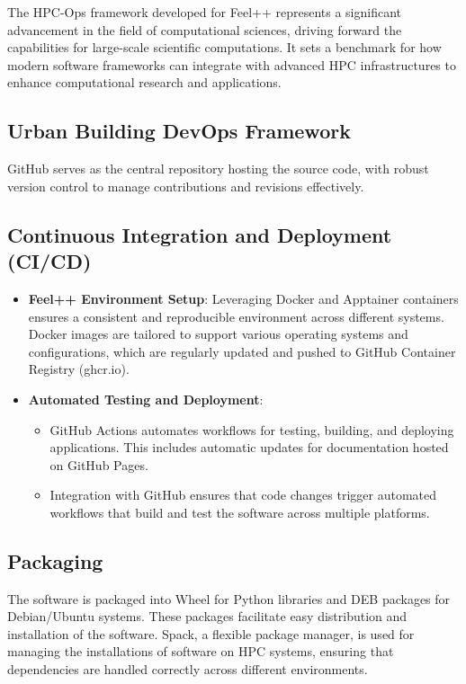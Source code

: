 The HPC-Ops framework developed for Feel++ represents a significant advancement in the field of computational sciences, driving forward the capabilities for large-scale scientific computations. It sets a benchmark for how modern software frameworks can integrate with advanced HPC infrastructures to enhance computational research and applications.

\subsection{Urban Building DevOps Framework}


GitHub serves as the central repository hosting the source code, with robust version control to manage contributions and revisions effectively.

\subsection{Continuous Integration and Deployment (CI/CD)}
\begin{itemize}
    \item \textbf{Feel++ Environment Setup}: Leveraging Docker and Apptainer containers ensures a consistent and reproducible environment across different systems. Docker images are tailored to support various operating systems and configurations, which are regularly updated and pushed to GitHub Container Registry (ghcr.io).
    \item \textbf{Automated Testing and Deployment}:
    \begin{itemize}
        \item GitHub Actions automates workflows for testing, building, and deploying applications. This includes automatic updates for documentation hosted on GitHub Pages.
        \item Integration with GitHub ensures that code changes trigger automated workflows that build and test the software across multiple platforms.
    \end{itemize}
\end{itemize}

\subsection{Packaging}
The software is packaged into Wheel for Python libraries and DEB packages for Debian/Ubuntu systems. These packages facilitate easy distribution and installation of the software. Spack, a flexible package manager, is used for managing the installations of software on HPC systems, ensuring that dependencies are handled correctly across different environments.

